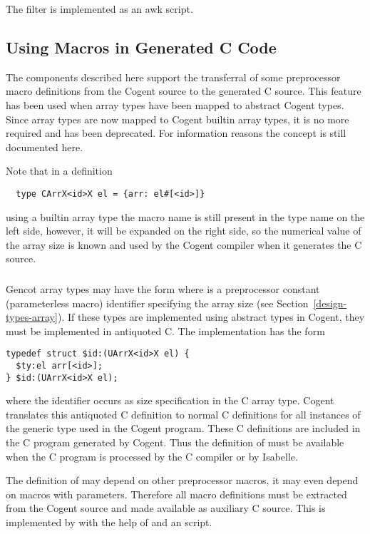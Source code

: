 The filter is implemented as an awk script.

\subsection{Using Macros in Generated C Code}
\label{impl-ocomps-macros}

The components described here support the transferral of some preprocessor macro definitions from the Cogent source
to the generated C source. This feature has been used when array types have been mapped to abstract Cogent types. 
Since array types are now mapped to Cogent builtin array types, it is no more required and has been deprecated. For
information reasons the concept is still documented here.

Note that in a definition 
\begin{verbatim}
  type CArrX<id>X el = {arr: el#[<id>]}
\end{verbatim}
using a builtin array type the macro name  is still present in the type name on the left side, however, it
will be expanded on the right side, so the numerical value of the array size is known and used by the Cogent compiler
when it generates the C source.

\subsubsection{}

Gencot array types may have the form  where  is a preprocessor constant (parameterless macro) 
identifier specifying the array size (see Section~\ref{design-types-array}). If these types are implemented using
abstract types in Cogent, they must be implemented in antiquoted C. The implementation has the form 
\begin{verbatim}
typedef struct $id:(UArrX<id>X el) {
  $ty:el arr[<id>];
} $id:(UArrX<id>X el);
\end{verbatim}
where the identifier  occurs as size specification in the C array type. Cogent translates this antiquoted 
C definition to normal C definitions for all instances of the generic type used in the Cogent program. These C definitions
are included in the C program generated by Cogent.
Thus the definition of  must be available when the C program is processed by the C compiler or by Isabelle.

The definition of  may depend on other preprocessor macros, it may even depend on macros with parameters.
Therefore all macro definitions must be extracted from the Cogent source and made available as auxiliary C source.
This is implemented by  with the help of  and an  script.

